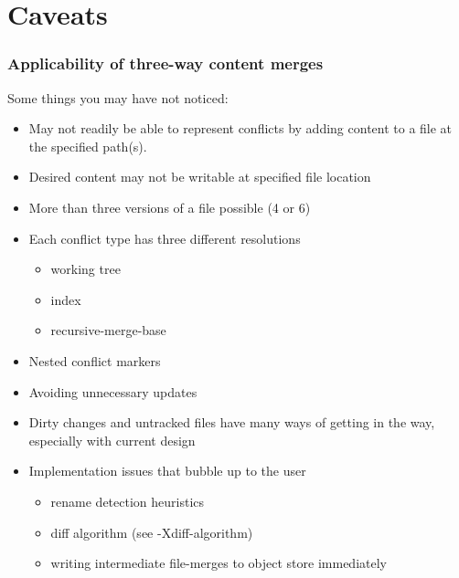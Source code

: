 \documentclass[t]{beamer}
\begin{document}

\section{Caveats}
\begin{frame}
  \frametitle{Applicability of three-way content merges}

  Some things you may have not noticed:
  \begin{itemize}[<+->]
    \item May not readily be able to represent conflicts by adding content
          to a file at the specified path(s).
    \item Desired content may not be writable at specified file location
    \item More than three versions of a file possible (4 or 6)
    \item Each conflict type has three different resolutions
    \begin{itemize}
      \item working tree
      \item index
      \item recursive-merge-base
    \end{itemize}
    \item Nested conflict markers
    \item Avoiding unnecessary updates
    \item Dirty changes and untracked files have many ways of getting
          in the way, especially with current design
    \item Implementation issues that bubble up to the user
    \begin{itemize}
      \item rename detection heuristics
      \item diff algorithm (see -Xdiff-algorithm)
      \item writing intermediate file-merges to object store immediately
    \end{itemize}
  \end{itemize}

\end{frame}

\end{document}
